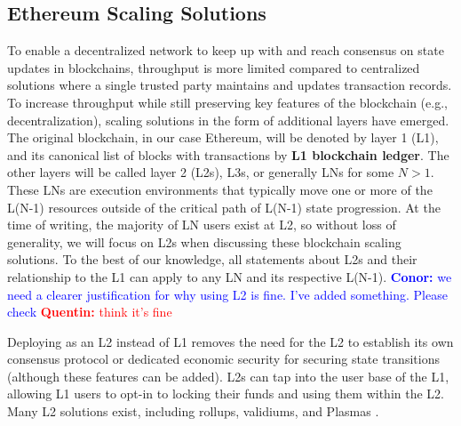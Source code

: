 \documentclass[a4paper]{article}
\theoremstyle{boldstyle}
\newcommand{\cm}[1]{\textcolor{blue}{\textbf{Conor:} #1}}
\newcommand{\qb}[1]{\textcolor{red}{\textbf{Quentin:} #1}}
\begin{document}

\subsection{Ethereum Scaling Solutions}\label{sec:intro_L2}
To enable a decentralized network to keep up with and reach consensus on state updates in blockchains, throughput is more limited compared to centralized solutions where a single trusted party maintains and updates transaction records. To increase throughput while still preserving key features of the blockchain (e.g., decentralization), scaling solutions in the form of additional layers have emerged. The original blockchain, in our case Ethereum, will be denoted by layer 1 (L1), and its canonical list of blocks with transactions by \textbf{L1 blockchain ledger}. The other layers will be called layer 2 (L2s), L3s, or generally LNs for some $N>1$. These LNs are execution environments that typically move one or more of the L(N-1) resources outside of the critical path of L(N-1) state progression. At the time of writing, the majority of LN users exist at L2, so without loss of generality, we will focus on L2s when discussing these blockchain scaling solutions. To the best of our knowledge, all statements about L2s and their relationship to the L1 can apply to any LN and its respective L(N-1). \cm{we need a clearer justification for why using L2 is fine. I've added something. Please check} \qb{think it's fine}
\par
Deploying as an L2 instead of L1 removes the need for the L2 to establish its own consensus protocol or dedicated economic security for securing state transitions (although these features can be added). L2s can tap into the user base of the L1, allowing L1 users to opt-in to locking their funds and using them within the L2. Many L2 solutions exist, including rollups, validiums, and Plasmas \cite{L2_versus_execution_sharding}. 
\end{document}
